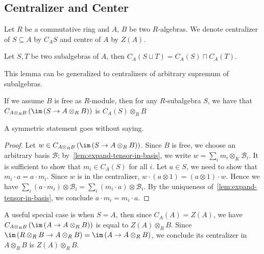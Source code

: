 \subsection{Centralizer and Center}
Let $R$ be a commutative ring and $A$, $B$ be two $R$-algebras. We denote
centralizer of $S\subseteq A$ by $C_{A}S$ and centre of $A$ by $Z(A)$.

\begin{lemma}\label{lem:sup-centralizer}
  Let $S, T$ be two subalgebras of $A$, then
  $C_{A}(S\sqcup T)=C_{A}(S)\sqcap C_{A}(T)$. \leanok
\end{lemma}
This lemma can be generalized to centralizers of arbitrary supremum of
subalgebras.

\begin{lemma}\label{lem:centralizer-inclusion-tensor}
  If we assume $B$ is free as $R$-module, then for any $R$-subalgebra $S$, we
  have that $C_{A\otimes_{R}B}\left(\im\left(S\to A\otimes_{R}B\right)\right)$
  is $C_{A}(S) \otimes_{R} B$
  \leanok
\end{lemma}
A symmetric statement goes without saying.
\begin{proof}
  Let $w\in C_{A\otimes_{R}B}\left(\im\left(S\to A\otimes_{R}B\right)\right)$.
  Since $B$ is free, we choose an arbitrary basis $\mathcal{B}$;
  by~\cref{lem:expand-tensor-in-basis}, we write
  $w = \sum_{i}m_{i}\otimes_{K}\mathcal{B}_{i}$. It is sufficient to show that
  $m_{i}\in C_{A}(S)$ for all $i$. Let $a \in S$, we need to show that
  $m_{i}\cdot a = a \cdot m_{i}$. Since $w$ is in the centralizer,
  $w \cdot (a\otimes 1) = (a\otimes 1)\cdot w$. Hence we have
  $\sum_{i}(a\cdot m_{i})\otimes\mathcal{B}_{i}=\sum_{i}(m_{i}\cdot a)\otimes\mathcal{B}_{i}$.
  By the uniqueness of~\cref{lem:expand-tensor-in-basis}, we conclude
  $a\cdot m_{i}=m_{i}\cdot a$.
\end{proof}

\begin{remark}
  A useful special case is when $S=A$, then since $C_{A}(A)=Z(A)$, we have
  $C_{A\otimes_{R}B}\left(\im\left(A\to A\otimes_{R} B\right)\right)$ is equal
  to $Z(A)\otimes_{R} B$. Since
  $\im\left(R\otimes_{R}B\to A\otimes_{R}B\right)=\im\left(A\to A\otimes_{R}B\right)$,
  we conclude its centralizer in $A\otimes_{R}B$ is $Z(A)\otimes_{R}B$.
\end{remark}

